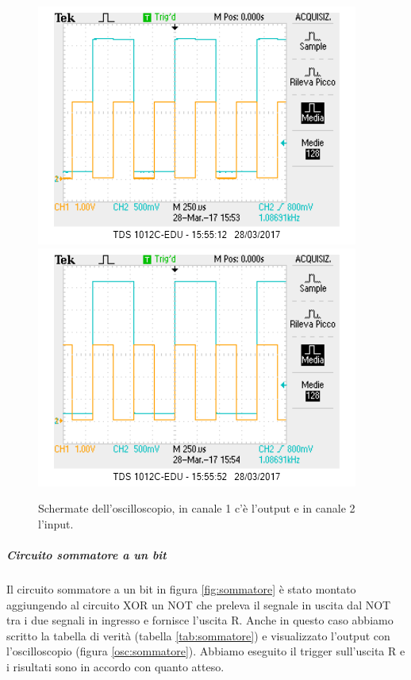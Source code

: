 \documentclass[10pt,a4paper]{article}
\begin{document}
\begin{figure}[!htb]
  \centering
  \includegraphics[scale=0.75]{xor1.png}\includegraphics[scale=0.75]{xor2.png}
\caption{Schermate dell'oscilloscopio, in canale 1 c'è l'output e in canale 2 l'input.\label{osc:XOR}}
\end{figure}

\subparagraph{Circuito sommatore a un bit}
Il circuito sommatore a un bit in figura \ref{fig:sommatore} è stato montato aggiungendo al circuito XOR un NOT che preleva il segnale in uscita dal NOT tra i due segnali in ingresso e fornisce l'uscita R. Anche in questo caso abbiamo scritto la tabella di verità (tabella \ref{tab:sommatore}) e visualizzato l'output con l'oscilloscopio (figura \ref{osc:sommatore}). Abbiamo eseguito il trigger sull'uscita R e i risultati sono in accordo con quanto atteso.

\end{document}
